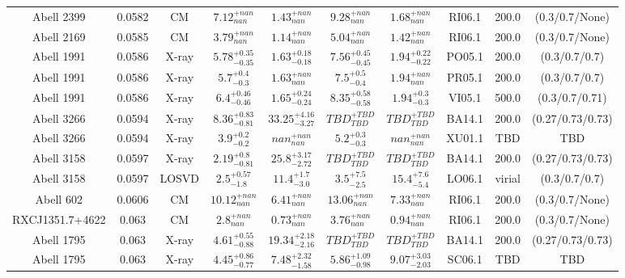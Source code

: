 \begin{table}
\begin{tabular}{cccccccccc}
Abell 2399 & 0.0582 & CM & ${7.12}^{+nan}_{nan}$ & ${1.43}^{+nan}_{nan}$ & ${9.28}^{+nan}_{nan}$ & ${1.68}^{+nan}_{nan}$ & RI06.1 & 200.0 & (0.3/0.7/None) \\
Abell 2169 & 0.0585 & CM & ${3.79}^{+nan}_{nan}$ & ${1.14}^{+nan}_{nan}$ & ${5.04}^{+nan}_{nan}$ & ${1.42}^{+nan}_{nan}$ & RI06.1 & 200.0 & (0.3/0.7/None) \\
Abell 1991 & 0.0586 & X-ray & ${5.78}^{+0.35}_{-0.35}$ & ${1.63}^{+0.18}_{-0.18}$ & ${7.56}^{+0.45}_{-0.45}$ & ${1.94}^{+0.22}_{-0.22}$ & PO05.1 & 200.0 & (0.3/0.7/0.7) \\
Abell 1991 & 0.0586 & X-ray & ${5.7}^{+0.4}_{-0.3}$ & ${1.63}^{+nan}_{nan}$ & ${7.5}^{+0.5}_{-0.4}$ & ${1.94}^{+nan}_{nan}$ & PR05.1 & 200.0 & (0.3/0.7/0.7) \\
Abell 1991 & 0.0586 & X-ray & ${6.4}^{+0.46}_{-0.46}$ & ${1.65}^{+0.24}_{-0.24}$ & ${8.35}^{+0.58}_{-0.58}$ & ${1.94}^{+0.3}_{-0.3}$ & VI05.1 & 500.0 & (0.3/0.7/0.71) \\
Abell 3266 & 0.0594 & X-ray & ${8.36}^{+0.83}_{-0.81}$ & ${33.25}^{+4.16}_{-3.27}$ & ${TBD}^{+TBD}_{TBD}$ & ${TBD}^{+TBD}_{TBD}$ & BA14.1 & 200.0 & (0.27/0.73/0.73) \\
Abell 3266 & 0.0594 & X-ray & ${3.9}^{+0.2}_{-0.2}$ & ${nan}^{+nan}_{nan}$ & ${5.2}^{+0.3}_{-0.3}$ & ${nan}^{+nan}_{nan}$ & XU01.1 & TBD & TBD \\
Abell 3158 & 0.0597 & X-ray & ${2.19}^{+0.8}_{-0.81}$ & ${25.8}^{+3.17}_{-2.72}$ & ${TBD}^{+TBD}_{TBD}$ & ${TBD}^{+TBD}_{TBD}$ & BA14.1 & 200.0 & (0.27/0.73/0.73) \\
Abell 3158 & 0.0597 & LOSVD & ${2.5}^{+0.57}_{-1.8}$ & ${11.4}^{+1.7}_{-3.0}$ & ${3.5}^{+7.5}_{-2.5}$ & ${15.4}^{+7.6}_{-5.4}$ & LO06.1 & virial & (0.3/0.7/0.7) \\
Abell 602 & 0.0606 & CM & ${10.12}^{+nan}_{nan}$ & ${6.41}^{+nan}_{nan}$ & ${13.06}^{+nan}_{nan}$ & ${7.33}^{+nan}_{nan}$ & RI06.1 & 200.0 & (0.3/0.7/None) \\
RXCJ1351.7+4622 & 0.063 & CM & ${2.8}^{+nan}_{nan}$ & ${0.73}^{+nan}_{nan}$ & ${3.76}^{+nan}_{nan}$ & ${0.94}^{+nan}_{nan}$ & RI06.1 & 200.0 & (0.3/0.7/None) \\
Abell 1795 & 0.063 & X-ray & ${4.61}^{+0.55}_{-0.88}$ & ${19.34}^{+2.18}_{-2.16}$ & ${TBD}^{+TBD}_{TBD}$ & ${TBD}^{+TBD}_{TBD}$ & BA14.1 & 200.0 & (0.27/0.73/0.73) \\
Abell 1795 & 0.063 & X-ray & ${4.45}^{+0.86}_{-0.77}$ & ${7.48}^{+2.32}_{-1.58}$ & ${5.86}^{+1.09}_{-0.98}$ & ${9.07}^{+3.03}_{-2.03}$ & SC06.1 & TBD & TBD \\

\end{tabular}
\end{table}
